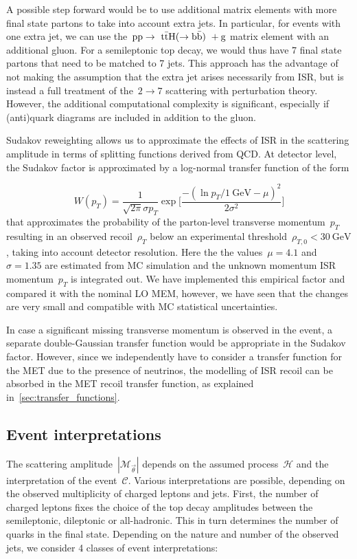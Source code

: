 A possible step forward would be to use additional matrix elements with more final state partons to take into account extra jets. In particular, for events with one extra jet, we can use the~$\mathrm{pp} \rightarrow~\mathrm{t} \bar{\mathrm{t}} \mathrm{H} (\rightarrow \mathrm{b}\bar{\mathrm{b}})~+ \mathrm{g}$ matrix element with an additional gluon. For a semileptonic top decay, we would thus have 7 final state partons that need to be matched to 7 jets. This approach has the advantage of not making the assumption that the extra jet arises necessarily from ISR, but is instead a full treatment of the~$2 \rightarrow 7$ scattering with perturbation theory. However, the additional computational complexity is significant, especially if (anti)quark diagrams are included in addition to the gluon.

Sudakov reweighting allows us to approximate the effects of ISR in the scattering amplitude in terms of splitting functions derived from QCD. At detector level, the Sudakov factor is approximated by a log-normal transfer function of the form

\begin{equation}
W(p_T) = \frac{1}{\sqrt{2\pi} \sigma p_T} \exp \biggl[ \frac{-(\ln{p_T/1~\mathrm{GeV}} - \mu)^2}{2\sigma^2}\biggr]
\end{equation}
that approximates the probability of the parton-level transverse momentum~$p_T$ resulting in an observed recoil~$\rho_T$ below an experimental threshold~$\rho_{T,0} < 30~\mathrm{GeV}$, taking into account detector resolution. Here the the values~$\mu = 4.1$ and~$\sigma = 1.35$ are estimated from MC simulation and the unknown momentum ISR momentum~$p_T$ is integrated out. We have implemented this empirical factor and compared it with the nominal LO MEM, however, we have seen that the changes are very small and compatible with MC statistical uncertainties. 

In case a significant missing transverse momentum is observed in the event, a separate double-Gaussian transfer function would be appropriate in the Sudakov factor. However, since we independently have to consider a transfer function for the MET due to the presence of neutrinos, the modelling of ISR recoil can be absorbed in the MET recoil transfer function, as explained in~\cref{sec:transfer_functions}.

\subsection{Event interpretations}
\label{sec:event_interpretation}

The scattering amplitude~$|\mathcal{M}_{\vec{\theta}}|$ depends on the assumed process~$\mathcal{H}$ and the interpretation of the event~$\mathcal{C}$. Various interpretations are possible, depending on the observed multiplicity of charged leptons and jets. First, the number of charged leptons fixes the choice of the top decay amplitudes between the semileptonic, dileptonic or all-hadronic. This in turn determines the number of quarks in the final state. Depending on the nature and number of the observed jets, we consider 4 classes of event interpretations:

